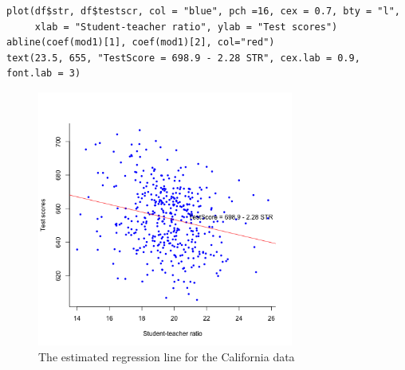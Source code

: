 \documentclass[11pt]{article}
\begin{document}
\begin{verbatim}
plot(df$str, df$testscr, col = "blue", pch =16, cex = 0.7, bty = "l",
     xlab = "Student-teacher ratio", ylab = "Test scores")
abline(coef(mod1)[1], coef(mod1)[2], col="red")
text(23.5, 655, "TestScore = 698.9 - 2.28 STR", cex.lab = 0.9, font.lab = 3)
\end{verbatim}

\begin{figure}[htbp]
\centering
\includegraphics[width=0.75\textwidth]{fig43.png}
\caption{The estimated regression line for the California data}
\end{figure}
\end{document}
